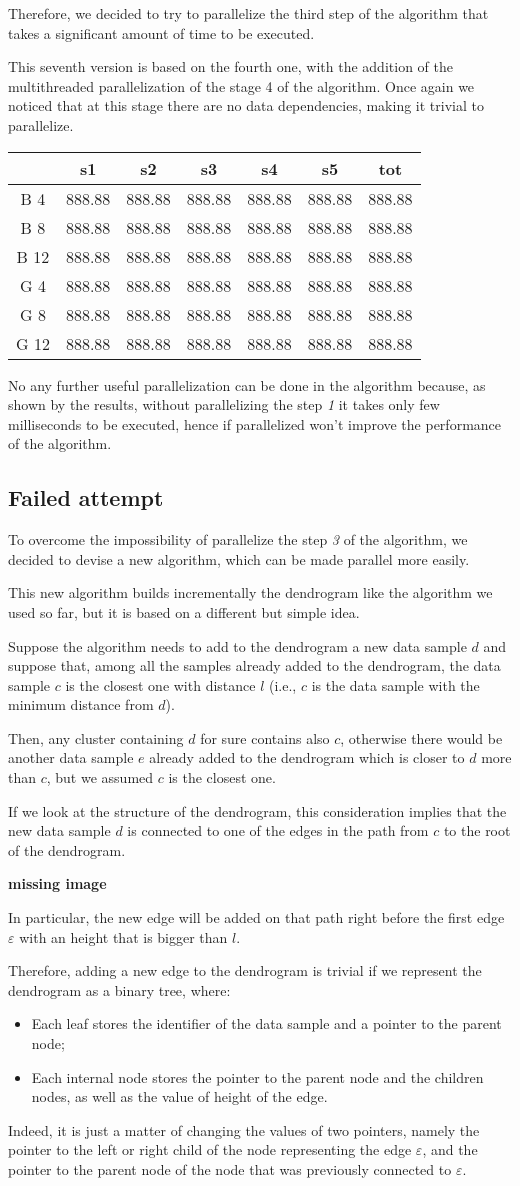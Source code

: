 \documentclass{article}
\newcommand{\loremTableShort}{
    \begin{table}[H]
        \centering
        \begin{tabular}[H]{ccccccc}
            \hline
            & s1     & s2     & s3     & s4     & s5     & tot    \\
            \hline
            B 4  & 888.88 & 888.88 & 888.88 & 888.88 & 888.88 & 888.88 \\
            B 8  & 888.88 & 888.88 & 888.88 & 888.88 & 888.88 & 888.88 \\
            B 12 & 888.88 & 888.88 & 888.88 & 888.88 & 888.88 & 888.88 \\
            G 4  & 888.88 & 888.88 & 888.88 & 888.88 & 888.88 & 888.88 \\
            G 8  & 888.88 & 888.88 & 888.88 & 888.88 & 888.88 & 888.88 \\
            G 12 & 888.88 & 888.88 & 888.88 & 888.88 & 888.88 & 888.88 \\
            \hline
        \end{tabular}
        \label{tab:my_label}
    \end{table}
}
\begin{document}
Therefore, we decided to try to parallelize the third step of the algorithm that takes a
significant amount of time to be executed.

This seventh version is based on the fourth one, with the addition of
the multithreaded parallelization of the stage 4 of the algorithm. Once
again we noticed that at this stage there are no data dependencies,
making it trivial to parallelize.

\loremTableShort

No any further useful parallelization can be done in the algorithm because, as shown by the
results, without parallelizing the step \textit{1} it takes only few milliseconds to be executed,
hence if parallelized won't improve the performance of the algorithm.


\hypertarget{failed-attempt}{
    \subsection{Failed attempt}
    \label{failed-attempt}}

To overcome the impossibility of parallelize the step \textit{3} of the algorithm, we decided to
devise a new algorithm, which can be made parallel more easily.

This new algorithm builds incrementally the dendrogram like the algorithm we used so far, but it
is based on a different but simple idea.

Suppose the algorithm needs to add to the dendrogram a new data sample $d$ and suppose that, among
all the samples already added to the dendrogram, the data sample $c$ is the closest one with
distance $l$ (i.e., $c$ is the data sample with the minimum distance from $d$).

Then, any cluster containing $d$ for sure contains also $c$, otherwise there would be another
data sample $e$ already added to the dendrogram which is closer to $d$ more than $c$, but we assumed
$c$ is the closest one.

If we look at the structure of the dendrogram, this consideration implies that the new data sample
$d$ is connected to one of the edges in the path from $c$ to the root of the dendrogram.

\textbf{missing image}

In particular, the new edge will be added on that path right before the first edge $\varepsilon$
with an
height that is bigger than $l$.

Therefore, adding a new edge to the dendrogram is trivial if we represent the dendrogram as a
binary tree, where:
\begin{itemize}
    \item Each leaf stores the identifier of the data sample and a pointer to the parent node;
    \item Each internal node stores the pointer to the parent node and the children nodes, as
    well as the value of height of the edge.
\end{itemize}
Indeed, it is just a matter of changing the values of two pointers, namely the pointer to the
left or right child of the node representing the edge $\varepsilon$, and the pointer to the
parent node of the node that was previously connected to $\varepsilon$.
\end{document}
